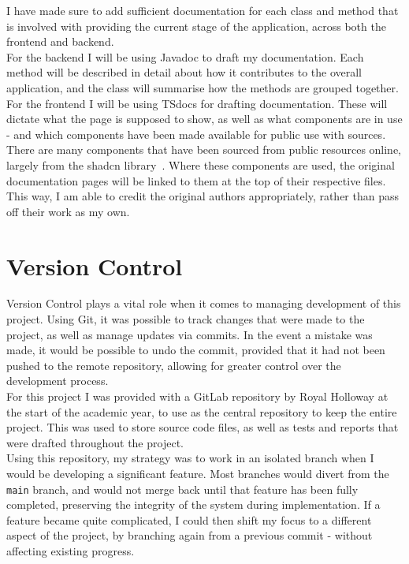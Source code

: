 \documentclass[]{final_report}
\begin{document}
I have made sure to add sufficient documentation for each class and method that is involved with providing the current stage of the application, across both the frontend and backend.\\

For the backend I will be using Javadoc to draft my documentation. Each method will be described in detail about how it contributes to the overall application, and the class will summarise how the methods are grouped together. For the frontend I will be using TSdocs for drafting documentation. These will dictate what the page is supposed to show, as well as what components are in use - and which components have been made available for public use with sources. \\

There are many components that have been sourced from public resources online, largely from the shadcn library~\cite{SHADCN}. Where these components are used, the original documentation pages will be linked to them at the top of their respective files. This way, I am able to credit the original authors appropriately, rather than pass off their work as my own.

\section{Version Control}

Version Control plays a vital role when it comes to managing development of this project. Using Git, it was possible to track changes that were made to the project, as well as manage updates via commits. In the event a mistake was made, it would be possible to undo the commit, provided that it had not been pushed to the remote repository, allowing for greater control over the development process.\\

For this project I was provided with a GitLab repository by Royal Holloway at the start of the academic year, to use as the central repository to keep the entire project. This was used to store source code files, as well as tests and reports that were drafted throughout the project. \\

Using this repository, my strategy was to work in an isolated branch when I would be developing a significant feature. Most branches would divert from the \verb|main| branch, and would not merge back until that feature has been fully completed, preserving the integrity of the system during implementation. If a feature became quite complicated, I could then shift my focus to a different aspect of the project, by branching again from a previous commit - without affecting existing progress.\\
\end{document}
